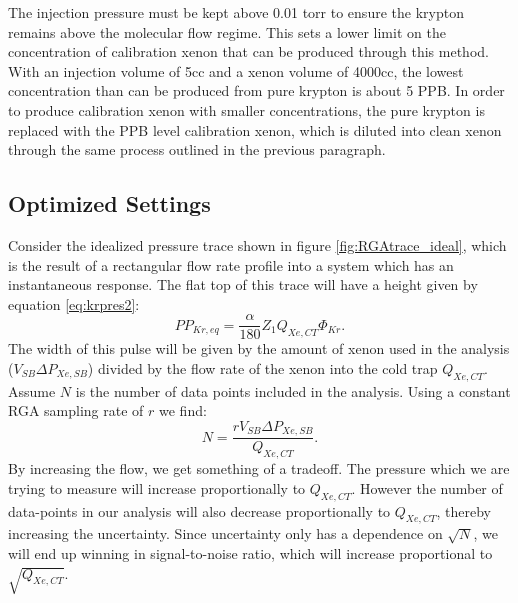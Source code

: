 \documentclass[12pt]{article}
\begin{document}
The injection pressure must be kept above 0.01 torr to ensure the krypton remains above the molecular flow regime. This sets a lower limit on the concentration of calibration xenon that can be produced through this method. With an injection volume of 5cc and a xenon volume of 4000cc, the lowest concentration than can be produced from pure krypton is about 5 PPB. In order to produce calibration xenon with smaller concentrations, the pure krypton is replaced with the PPB level calibration xenon, which is diluted into clean xenon through the same process outlined in the previous paragraph.

\subsection{Optimized Settings}
Consider the idealized pressure trace shown in figure \ref{fig:RGAtrace_ideal}, which is the result of a rectangular flow rate profile into a system which has an instantaneous response. The flat top of this trace will have a height given by equation \ref{eq:krpres2}:
\begin{equation}
PP_{Kr,eq}=\frac{\alpha}{180}Z_{1}Q_{Xe,CT}\Phi_{Kr}.
\end{equation}
The width of this pulse will be given by the amount of xenon used in the analysis ($V_{SB}\Delta P_{Xe,SB}$) divided by the flow rate of the xenon into the cold trap $Q_{Xe,CT}$.  Assume $N$ is the number of data points included in the analysis. Using a constant RGA sampling rate of $r$ we find: 
\begin{equation}
N=\frac{rV_{SB}\Delta P_{Xe,SB}}{Q_{Xe,CT}}.
\end{equation}
By increasing the flow, we get something of a tradeoff. The pressure which we are trying to measure will increase proportionally to $Q_{Xe,CT}$. However the number of data-points in our analysis will also decrease proportionally to $Q_{Xe,CT}$, thereby increasing the uncertainty. Since uncertainty only has a dependence on $\sqrt{N}$, we will end up winning in signal-to-noise ratio, which will increase proportional to $\sqrt{Q_{Xe,CT}}$. 
\end{document}
